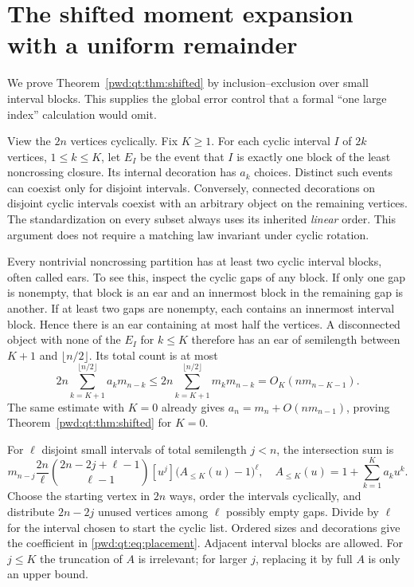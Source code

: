 \documentclass[11pt,letterpaper]{article}
\numberwithin{equation}{section}
\theoremstyle{remark}\newtheorem{remark}[theorem]{Remark}
\begin{document}
\section{The shifted moment expansion with a uniform remainder}\label{pwd:qt:sec:shifted}
We prove Theorem~\ref{pwd:qt:thm:shifted} by inclusion--exclusion over small interval blocks. This supplies the global error control that a formal ``one large index'' calculation would omit.

View the $2n$ vertices cyclically. Fix $K\ge1$. For each cyclic interval $I$ of $2k$ vertices, $1\le k\le K$, let $E_I$ be the event that $I$ is exactly one block of the least noncrossing closure. Its internal decoration has $a_k$ choices. Distinct such events can coexist only for disjoint intervals. Conversely, connected decorations on disjoint cyclic intervals coexist with an arbitrary object on the remaining vertices. The standardization on every subset always uses its inherited \emph{linear} order. This argument does not require a matching law invariant under cyclic rotation.

Every nontrivial noncrossing partition has at least two cyclic interval blocks, often called ears. To see this, inspect the cyclic gaps of any block. If only one gap is nonempty, that block is an ear and an innermost block in the remaining gap is another. If at least two gaps are nonempty, each contains an innermost interval block. Hence there is an ear containing at most half the vertices. A disconnected object with none of the $E_I$ for $k\le K$ therefore has an ear of semilength between $K+1$ and $\lfloor n/2\rfloor$. Its total count is at most
\begin{equation}\label{pwd:qt:eq:noear}
 2n\sum_{k=K+1}^{\lfloor n/2\rfloor}a_km_{n-k}
 \le2n\sum_{k=K+1}^{\lfloor n/2\rfloor}m_km_{n-k}
 =O_K(nm_{n-K-1}).
\end{equation}
The same estimate with $K=0$ already gives $a_n=m_n+O(nm_{n-1})$, proving Theorem~\ref{pwd:qt:thm:shifted} for $K=0$.

For $\ell$ disjoint small intervals of total semilength $j<n$, the intersection sum is
\begin{equation}\label{pwd:qt:eq:placement}
 m_{n-j}\frac{2n}{\ell}
 \binom{2n-2j+\ell-1}{\ell-1}
 [u^j]\bigl(A_{\le K}(u)-1\bigr)^\ell,
 \quad A_{\le K}(u)=1+\sum_{k=1}^Ka_ku^k.
\end{equation}
Choose the starting vertex in $2n$ ways, order the intervals cyclically, and distribute $2n-2j$ unused vertices among $\ell$ possibly empty gaps. Divide by $\ell$ for the interval chosen to start the cyclic list. Ordered sizes and decorations give the coefficient in \eqref{pwd:qt:eq:placement}. Adjacent interval blocks are allowed. For $j\le K$ the truncation of $A$ is irrelevant; for larger $j$, replacing it by full $A$ is only an upper bound.
\end{document}
